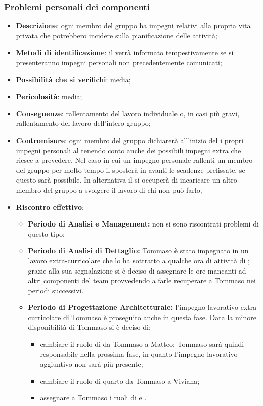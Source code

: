 		\subsubsection{Problemi personali dei componenti}
		\begin{itemize}
			\item \textbf{Descrizione}: ogni membro del gruppo ha impegni relativi alla propria vita privata che potrebbero incidere sulla pianificazione delle attività;
			\item \textbf{Metodi di identificazione}: il \RES{} verrà informato tempestivamente se si presenteranno impegni personali non precedentemente comunicati;
			\item \textbf{Possibilità che si verifichi}: media;
			\item \textbf{Pericolosità}: media;
			\item \textbf{Conseguenze}: rallentamento del lavoro individuale o, in casi più gravi, rallentamento del lavoro dell'intero gruppo;
			\item \textbf{Contromisure}: ogni membro del gruppo dichiarerà all'inizio del  i propri impegni personali al \RES{} tenendo conto anche dei possibili impegni extra che riesce a prevedere. Nel caso in cui un impegno personale rallenti un membro del gruppo per molto tempo il \RES{} sposterà in avanti le scadenze prefissate, se questo sarà possibile. In alternativa il \RES{} si occuperà di incaricare un altro membro del gruppo a svolgere il lavoro di chi non può farlo; 
			\item \textbf{Riscontro effettivo}:
			\begin{itemize}
				\item \textbf{Periodo di Analisi e Management:} non si sono riscontrati problemi di questo tipo;
				\item \textbf{Periodo di Analisi di Dettaglio:} Tommaso è stato impegnato in un lavoro extra-curricolare che lo ha sottratto a qualche ora di attività di \AN; grazie alla sua segnalazione si è deciso di assegnare le ore mancanti ad altri componenti del team provvedendo a farle recuperare a Tommaso nei periodi successivi.
				\item \textbf{Periodo di Progettazione Architetturale:} l'impegno lavorativo extra-curricolare di Tommaso è proseguito anche in questa fase. Data la minore disponibilità di Tommaso si è deciso di:
					\begin{itemize}
						\item cambiare il ruolo di \RES {} da Tommaso a Matteo; Tommaso sarà quindi responsabile nella prossima fase, in quanto l'impegno lavorativo aggiuntivo non sarà più presente;
						\item cambiare il ruolo di quarto \PRJ {} da Tommaso a Viviana;
						\item assegnare a Tommaso i ruoli di \VER{} e \AN.
					\end{itemize}
			\end{itemize}
		\end{itemize}
		
